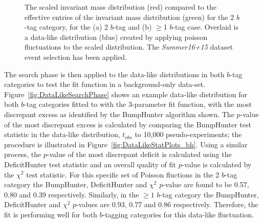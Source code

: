 \begin{figure}[!ht]
  \begin{center}
   \captionsetup[subfigure]{aboveskip=0pt,justification=centering}
  \end{center}
  \caption{The scaled invariant mass distribution (red) compared to the
    effective entries of the invariant mass distribution (green) for the 2 $b$-tag category,
    for the (a) 2 $b$-tag and (b) $\geq$1 $b$-tag case.
    Overlaid is a data-like distribution (blue) created by applying poisson fluctuations to the scaled distribution.
    The \textit{Summer16+15} dataset event selection has been applied.}
  \label{fig:effEntDataLike}
\end{figure}

The search phase is then applied to the data-like distributions
in both $b$-tag categories 
to test the fit function in a background-only data-set.
Figure~\ref{fig:DataLikeSearchPhase} shows an example data-like distribution for both $b$-tag categories fitted
to with the 3-parameter fit function,
with the most discrepant excess as identified by the BumpHunter algorithm shown.
The $p$-value of the most discrepant excess is calculated by comparing the BumpHunter test statistic in the data-like distribution, $t_{obs}$
to 10,000 pseudo-experiments; the procedure is illustrated in Figure~\ref{fig:DataLikeStatPlots_bh}.
Using a similar process, the $p$-value of the most discrepant deficit is calculated using the DeficitHunter test statistic
and an overall quality of fit $p$-value is calculated by the $\chi^{2}$ test statistic.
For this specific set of Poisson fluctions in the 2 $b$-tag category
the BumpHunter, DeficitHunter and  $\chi^{2}$ $p$-value are found to be
0.57, 0.80 and 0.39 respectively.
Similarly, in the $\geq1$ $b$-tag category the
BumpHunter, DeficitHunter and  $\chi^{2}$ $p$-values are
0.93, 0.77 and 0.86 respectively.
Therefore, the fit is performing well for both $b$-tagging categories for this data-like fluctuation.

